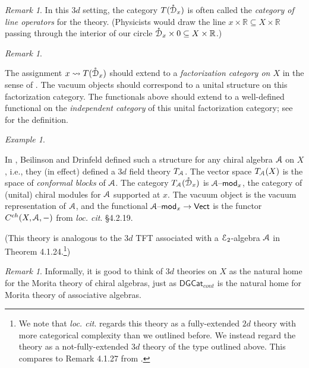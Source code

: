 \documentclass[reqno,11pt]{amsart}
\numberwithin{equation}{subsection}
\theoremstyle{remark}
\newtheorem{rem}[thm]{Remark}
\newtheorem{example}[thm]{Example}
\newcommand{\bR}{{\mathbb R}}
\newcommand{\sA}{{\EuScript A}}
\newcommand{\sD}{{\EuScript D}}
\newcommand{\sE}{{\EuScript E}}
\newcommand{\mathendash}{\text{\textendash}}
\newcommand{\Vect}{\mathsf{Vect}}
\renewcommand{\mod}{\mathendash\mathsf{mod}}
\newcommand{\DGCat}{\mathsf{DGCat}}
\renewcommand{\o}[1]{\mathring{#1}}
\renewcommand{\subset}{\subseteq}
\begin{document}
\begin{rem}

In this $3d$ setting, the category $T(\o{\sD}_x)$ is often
called the \emph{category of line operators} for the theory. (Physicists would 
draw the line $x \times \bR \subset X \times \bR$ passing through
the interior of our circle $\o{\sD}_x \times 0 \subset X \times \bR$.)

\end{rem}

\begin{rem}\label{r:fact-cats}

The assignment $x \rightsquigarrow T(\o{\sD}_x)$ should extend
to a \emph{factorization category on $X$} in the sense of
\cite{chiralcats}. The vacuum objects should correspond to a unital
structure on this factorization category. The functionals
above should extend to a well-defined functional on the
\emph{independent category} of this unital factorization category;
see \cite{indep-cat} for the definition.

\end{rem}

\begin{example}\label{e:3d-chiral}

In \cite{chiral}, Beilinson and Drinfeld defined such a structure
for any chiral algebra $\sA$ on $X$, i.e., they (in effect)
defined a $3d$ field theory $T_{\sA}$. 
The vector space $T_{\sA}(X)$ is the
space of \emph{conformal blocks} of $\sA$. The category
$T_{\sA}(\o{\sD}_x)$ is $\sA\mod_x$, the category of (unital) chiral
modules for $\sA$ supported at $x$. The vacuum object is the
vacuum representation of $\sA$, and the functional
$\sA\mod_x \to \Vect$ is the functor $C^{ch}(X,\sA,-)$ from
\emph{loc. cit}. \S 4.2.19.

(This theory is analogous to the $3d$ TFT associated
with a $\sE_2$-algebra $\sA$ in 
\cite{lurie-tft} Theorem 4.1.24.\footnote{We 
note that \emph{loc. cit}. regards this theory as a fully-extended
$2d$ theory with more categorical complexity than we outlined
before. We instead regard the theory as a not-fully-extended
$3d$ theory of the type outlined above. 
This compares to Remark 4.1.27 from \cite{lurie-tft}.})

\end{example}

\begin{rem}

Informally, it is good to think of $3d$ theories on $X$ as 
the natural home for the Morita theory of chiral algebras,
just as $\DGCat_{cont}$ is the natural home for Morita theory of
associative algebras.

\end{rem}
\end{document}
